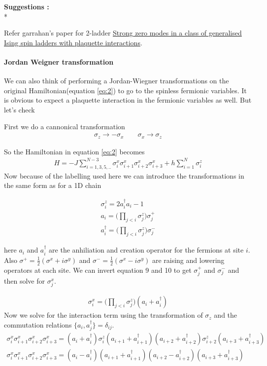\documentclass[a4paper]{extarticle}
\begin{document}
\textbf{Suggestions :} \\*

Refer garrahan's paper for 2-ladder \href{https://arxiv.org/pdf/1901.10211.pdf}{Strong zero modes in a class of generalised Ising spin ladders with plaquette interactions}.

\paragraph{Jordan Weigner transformation}


We can also think of performing a Jordan-Wiegner transformations on the original Hamiltonian(equation \ref{eq:2}) to go to the spinless fermionic variables. It is obvious to expect a plaquette interaction in the fermionic variables as well. But let's check

First we do a cannonical transformation 
\begin{eqnarray} \label{eq:7}
\sigma_z \rightarrow -\sigma_x \qquad \sigma_x \rightarrow \sigma_z
\end{eqnarray}

So the Hamiltonian in equation \ref{eq:2} becomes
\begin{eqnarray} \label{eq:8}
H = -J\sum_{i=1,3,5,..}^{N-3} {\sigma_i^x \sigma_{i+1}^x \sigma_{i+2}^x \sigma_{i+3}^x} + h\sum_{i=1}^{N} \sigma_i^z
\end{eqnarray}
Now because of the labelling used here we can introduce the transformations in the same form as for a 1D chain

\begin{eqnarray} \label{eq:9}
\sigma_i^z =  2 a_i^{\dagger} a_i - 1\\
a_i = \bigg(\prod_{j<i} \sigma_j^z \bigg) \sigma_j^+\\
a_i^{\dagger} = \bigg(\prod_{j<i} \sigma_j^z \bigg) \sigma_j^-
\end{eqnarray}

here $a_i$ and $a_i^{\dagger}$ are the anhiliation and creation operator for the fermions at site $i$. Also $\sigma^+ = \frac{1}{2} (\sigma^x + i\sigma^y)$ and $\sigma^- = \frac{1}{2} (\sigma^x - i\sigma^y)$ are raising and lowering operators at each site.
We can invert equation 9 and 10 to get $\sigma_j^+$ and $\sigma_j^-$ and then solve for $\sigma_j^x$.

\begin{eqnarray} \label{eq:10}
\sigma_i^x =  \bigg(\prod_{j<i} \sigma_j^z \bigg)(a_i + a_i^{\dagger})
\end{eqnarray}
Now we solve for the interaction term using the transformation of $\sigma_z$ and the commutation relations  $\{a_i,a_j^{\dagger}\}=\delta_{ij}$.
\begin{eqnarray} \label{eq:11}
\sigma_i^x \sigma_{i+1}^x \sigma_{i+2}^x \sigma_{i+3}^x = (a_i + a_i^{\dagger}) \sigma_i^z (a_{i+1} + a_{i+1}^{\dagger}) (a_{i+2} + a_{i+2}^{\dagger}) \sigma_{i+2}^z (a_{i+3} + a_{i+3}^{\dagger})\\
\sigma_i^x \sigma_{i+1}^x \sigma_{i+2}^x \sigma_{i+3}^x = (a_i - a_i^{\dagger}) (a_{i+1} + a_{i+1}^{\dagger}) (a_{i+2} - a_{i+2}^{\dagger}) (a_{i+3} + a_{i+3}^{\dagger})
\end{eqnarray}
\end{document}
